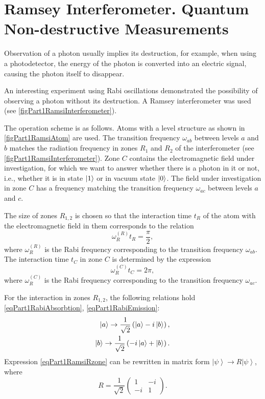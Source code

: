 \section{Ramsey Interferometer. Quantum Non-destructive Measurements}

Observation of a photon  usually implies its destruction, for example, when using a photodetector, the energy of the photon is converted into an electric signal, causing the photon itself to disappear.

An interesting experiment \cite{Nogues1999Nv400p239} using Rabi oscillations demonstrated the possibility of observing a photon without its destruction. A Ramsey interferometer was used (see \autoref{figPart1RamsiInterferometer}).





The operation scheme is as follows. Atoms with a level structure as shown in \autoref{figPart1RamsiAtom} are used. The transition frequency $\omega_{ab}$ between levels $a$ and $b$ matches the radiation frequency in zones $R_1$ and $R_2$ of the interferometer (see \autoref{figPart1RamsiInterferometer}). Zone $C$ contains the electromagnetic field under investigation, for which we want to answer whether there is a photon in it or not, i.e., whether it is in state $\ket{1}$ or in vacuum state $\ket{0}$. The field under investigation in zone $C$ has a frequency matching the transition frequency $\omega_{ac}$ between levels $a$ and $c$.

The size of zones $R_{1,2}$ is chosen so that the interaction time $t_R$ of the atom with the electromagnetic field in them corresponds to the relation
\begin{equation}
  \omega_R^{(R)} t_R = \frac{\pi}{2},
  \nonumber
\end{equation}
where $\omega_R^{(R)}$ is the Rabi frequency corresponding to the transition frequency $\omega_{ab}$.
The interaction time $t_C$ in zone $C$ is determined by the expression
\begin{equation}
  \omega_R^{(C)} t_C = 2 \pi,
  \nonumber
\end{equation}
where $\omega_R^{(C)}$ is the Rabi frequency corresponding to the transition frequency $\omega_{ac}$.

For the interaction in zones $R_{1,2}$, the following relations hold \eqref{eqPart1RabiAbsorbtion}, \ref{eqPart1RabiEmission}:
\begin{eqnarray}
  \ket{a} \rightarrow \frac{1}{\sqrt{2}}\left(
  \ket{a} - i \ket{b}  
  \right),
  \nonumber \\
  \ket{b} \rightarrow \frac{1}{\sqrt{2}}\left(
  -i \ket{a} + \ket{b}  
  \right).
  \label{eqPart1RamsiRzone}
\end{eqnarray}
Expression \eqref{eqPart1RamsiRzone} can be rewritten in matrix form $\left|\psi\right> \rightarrow R \left|\psi\right>$,
where
\[
R = \frac{1}{\sqrt{2}} \left(
\begin{array} {cc}
1 & -i
\\
-i & 1 
\end{array}
\right).
\]

